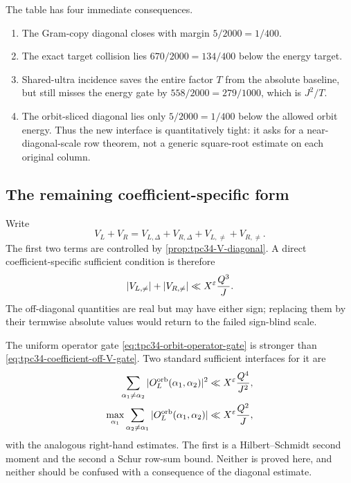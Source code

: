 The table has four immediate consequences.
\begin{enumerate}[label=\textup{(\roman*)}]
 \item The Gram-copy diagonal closes with margin
 \(5/2000=1/400\).
 \item The exact target collision lies \(670/2000=134/400\) below the
 energy target.
 \item Shared-ultra incidence saves the entire factor \(T\) from the
 absolute baseline, but still misses the energy gate by
 \(558/2000=279/1000\), which is \(J^2/T\).
 \item The orbit-sliced diagonal lies only \(5/2000=1/400\) below the
 allowed orbit energy.  Thus the new interface is quantitatively tight:
 it asks for a near-diagonal-scale row theorem, not a generic
 square-root estimate on each original column.
\end{enumerate}

\subsection{The remaining coefficient-specific form}

Write
\begin{equation}
 V_L+V_R
 =
 V_{L,\Delta}+V_{R,\Delta}
 +V_{L,\ne}+V_{R,\ne}.
 \label{eq:tpc34-V-full-split}
\end{equation}
The first two terms are controlled by
\cref{prop:tpc34-V-diagonal}.  A direct coefficient-specific sufficient
condition is therefore
\begin{equation}
 |V_{L,\ne}|+|V_{R,\ne}|
 \ll X^\varepsilon\frac{Q^3}{J}.
 \label{eq:tpc34-coefficient-off-V-gate}
\end{equation}
The off-diagonal quantities are real but may have either sign; replacing
them by their termwise absolute values would return to the failed
sign-blind scale.

The uniform operator gate
\eqref{eq:tpc34-orbit-operator-gate} is stronger than
\eqref{eq:tpc34-coefficient-off-V-gate}.  Two standard sufficient
interfaces for it are
\begin{align}
 \sum_{\alpha_1\ne\alpha_2}
 |O_L^{\rm orb}(\alpha_1,\alpha_2)|^2
 &\ll X^\varepsilon\frac{Q^4}{J^2},
 \label{eq:tpc34-HS-next-gate}\\
 \max_{\alpha_1}
 \sum_{\alpha_2\ne\alpha_1}
 |O_L^{\rm orb}(\alpha_1,\alpha_2)|
 &\ll X^\varepsilon\frac{Q^2}{J},
 \label{eq:tpc34-Schur-next-gate}
\end{align}
with the analogous right-hand estimates.  The first is a
Hilbert--Schmidt second moment and the second a Schur row-sum bound.
Neither is proved here, and neither should be confused with a consequence
of the diagonal estimate.

